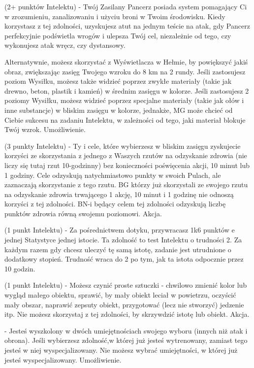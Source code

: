 { (2+ punktów Intelektu) - Twój Zasilany Pancerz posiada system pomagający Ci w zrozumieniu, zanalizowaniu i użyciu broni w Twoim środowisku. Kiedy korzystasz z tej zdolności, uzyskujesz atut na jednym teście na atak, gdy Pancerz perfekcyjnie podświetla wrogów i ulepsza Twój cel, niezależnie od tego, czy wykonujesz atak wręcz, czy dystansowy. 

Alternatywnie, możesz skorzystać z Wyświetlacza w Hełmie, by powiększyć jakiś obraz, zwiększając zasięg Twojego wzroku do 8 km na 2 rundy. Jeśli zastosujesz poziom Wysiłku, możesz także widzieć poprzez zwykłe materiały (takie jak drewno, beton, plastik i kamień) w średnim zasięgu w kolorze. Jeśli zastosujesz 2 poziomy Wysiłku, możesz widzieć poprzez specjalne materiały (takie jak ołów i inne substancje) w bliskim zasięgu w kolorze, jednakże, MG może chcieć od Ciebie sukcesu na zadaniu Intelektu, w zależności od tego, jaki materiał blokuje Twój wzrok. Umożliwienie.

 (3 punkty Intelektu) - Ty i cele, które wybierzesz w bliskim zasięgu zyskujecie korzyści ze skorzystania z jednego z Waszych rzutów na odzyskanie zdrowia (nie liczy się tutaj rzut 10-godzinny) bez konieczności poświęcenia akcji, 10 minut lub 1 godziny. Cele odzyskują natychmiastowo punkty w swoich Pulach, ale zaznaczają skorzystanie z tego rzutu. BG którzy już skorzystali ze swojego rzutu na odzyskanie zdrowia trwającego 1 akcję, 10 minut i 1 godzinę nie odnoszą korzyści z tej zdolności. BN-i będący celem tej zdolności odzyskują liczbę punktów zdrowia równą swojemu poziomowi. Akcja.

 (1 punkt Intelektu) - Za pośrednictwem dotyku, przywracasz 1k6 punktów e jednej Statystyce jednej istocie. Ta zdolność to test Intelektu o trudności 2. Za każdym razem gdy chcesz uleczyć tę samą istotę, zadanie jest utrudnione o dodatkowy stopień. Trudność wraca do 2 po tym, jak ta istota odpocznie przez 10 godzin.

 (1 punkt Intelektu) - Możesz czynić proste sztuczki - chwilowo zmienić kolor lub wygląd małego obiektu, sprawić, by mały obiekt leciał w powietrzu, oczyścić mały obszar, naprawić zepsuty obiekt, przygotować (lecz nie stworzyć) jedzenie itp. Nie możesz skorzystaj z tej zdolności, by skrzywdzić istotę lub obiekt. Akcja.

 - Jesteś wyszkolony w dwóch umiejętnościach swojego wyboru (innych niż atak i obrona). Jeśli wybierzesz zdolność,w której już jesteś wytrenowany, zamiast tego jesteś w niej wyspecjalizowany. Nie możesz wybrać umiejętności, w której już jesteś wyspecjalizowany. Umożliwienie.

}
